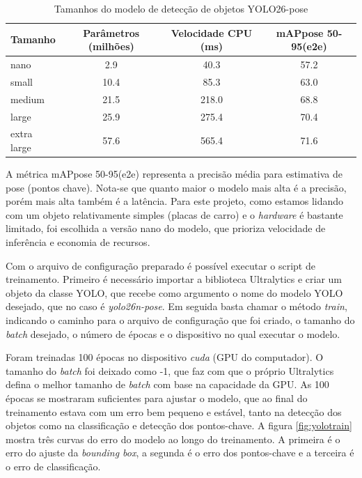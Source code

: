 \begin{table}[H]
\centering
\begin{tabular}{|l|c|c|c|}
\hline
\textbf{Tamanho} & \textbf{Parâmetros (milhões)} & \textbf{Velocidade CPU (ms)} & \textbf{mAPpose 50-95(e2e)} \\ \hline
nano & 2.9 & 40.3 & 57.2 \\ \hline
small & 10.4 & 85.3 & 63.0 \\ \hline
medium & 21.5 & 218.0 & 68.8 \\ \hline
large & 25.9 & 275.4 & 70.4 \\ \hline
extra large & 57.6 & 565.4 & 71.6 \\ \hline
\end{tabular}
\caption{Tamanhos do modelo de detecção de objetos YOLO26-pose}
\label{tab:tamanhos_yolo}
\end{table}

A métrica mAPpose 50-95(e2e) representa a precisão média para estimativa de pose (pontos chave). Nota-se que quanto maior o modelo mais alta é a precisão, porém mais alta também é a latência. Para este projeto, como estamos lidando com um objeto relativamente simples (placas de carro) e o \textit{hardware} é bastante limitado, foi escolhida a versão nano do modelo, que prioriza velocidade de inferência e economia de recursos.

Com o arquivo de configuração preparado é possível executar o script de treinamento. Primeiro é necessário importar a biblioteca Ultralytics e criar um objeto da classe YOLO, que recebe como argumento o nome do modelo YOLO desejado, que no caso é \textit{yolo26n-pose}. Em seguida basta chamar o método \textit{train}, indicando o caminho para o arquivo de configuração que foi criado, o tamanho do \textit{batch} desejado, o número de épocas e o dispositivo no qual executar o modelo.

Foram treinadas 100 épocas no dispositivo \textit{cuda} (GPU do computador). O tamanho do \textit{batch} foi deixado como -1, que faz com que o próprio Ultralytics defina o melhor tamanho de \textit{batch} com base na capacidade da GPU. As 100 épocas se mostraram suficientes para ajustar o modelo, que ao final do treinamento estava com um erro bem pequeno e estável, tanto na detecção dos objetos como na classificação e detecção dos pontos-chave.
A figura \ref{fig:yolotrain} mostra três curvas do erro do modelo ao longo do treinamento. A primeira é o erro do ajuste da \textit{bounding box}, a segunda é o erro dos pontos-chave e a terceira é o erro de classificação.

